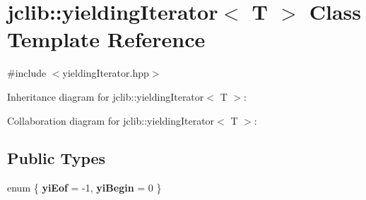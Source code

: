 \hypertarget{classjclib_1_1yieldingIterator}{}\section{jclib\+:\+:yielding\+Iterator$<$ T $>$ Class Template Reference}
\label{classjclib_1_1yieldingIterator}


{\ttfamily \#include $<$yielding\+Iterator.\+hpp$>$}



Inheritance diagram for jclib\+:\+:yielding\+Iterator$<$ T $>$\+:


Collaboration diagram for jclib\+:\+:yielding\+Iterator$<$ T $>$\+:
\subsection*{Public Types}
\begin{DoxyCompactItemize}
\item 
\mbox{\label{classjclib_1_1yieldingIterator_aae7b98f56a2855ce24229857a416e5ac}} 
enum \{ {\bfseries yi\+Eof} = -\/1, 
{\bfseries yi\+Begin} = 0
 \}
\end{DoxyCompactItemize}
